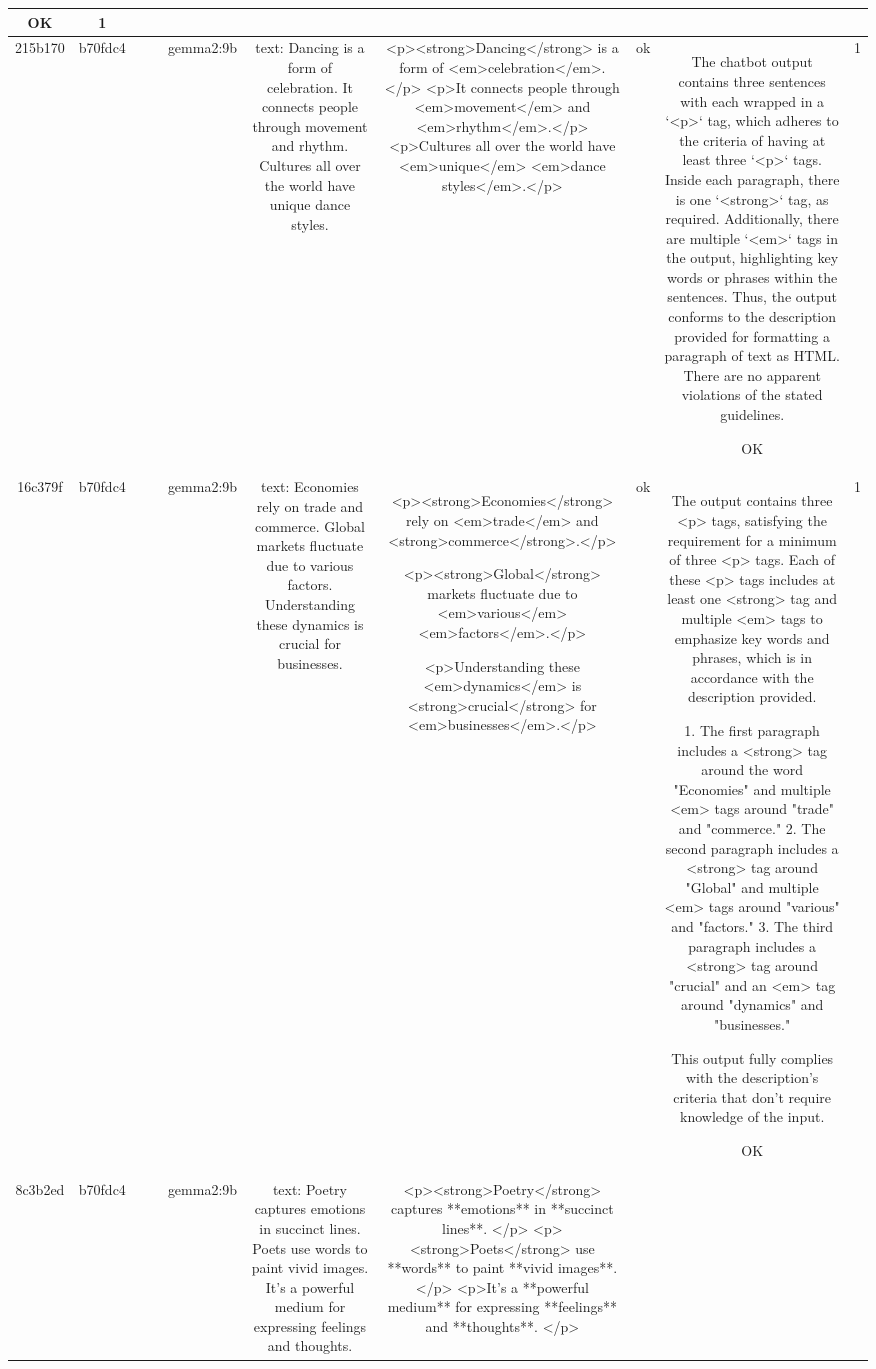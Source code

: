 \begin{table}[h!]
\begin{tabular}{|c|c|c|c|c|c|c|c|c|c|}
OK & 1\\
\hline
215b170 & b70fdc4 &  &  & gemma2:9b & text: Dancing is a form of celebration. It connects people through movement and rhythm. Cultures all over the world have unique dance styles. & <p><strong>Dancing</strong> is a form of <em>celebration</em>.</p>   
<p>It connects people through <em>movement</em> and <em>rhythm</em>.</p>   
<p>Cultures all over the world have <em>unique</em> <em>dance styles</em>.</p>  
 & ok & The chatbot output contains three sentences with each wrapped in a `<p>` tag, which adheres to the criteria of having at least three `<p>` tags. Inside each paragraph, there is one `<strong>` tag, as required. Additionally, there are multiple `<em>` tags in the output, highlighting key words or phrases within the sentences. Thus, the output conforms to the description provided for formatting a paragraph of text as HTML. There are no apparent violations of the stated guidelines.

OK & 1\\
\hline
16c379f & b70fdc4 &  &  & gemma2:9b & text: Economies rely on trade and commerce. Global markets fluctuate due to various factors. Understanding these dynamics is crucial for businesses. & <p><strong>Economies</strong> rely on <em>trade</em> and <strong>commerce</strong>.</p>

<p><strong>Global</strong> markets fluctuate due to <em>various</em> <em>factors</em>.</p>

<p>Understanding these <em>dynamics</em> is <strong>crucial</strong> for <em>businesses</em>.</p>   
 & ok & The output contains three <p> tags, satisfying the requirement for a minimum of three <p> tags. Each of these <p> tags includes at least one <strong> tag and multiple <em> tags to emphasize key words and phrases, which is in accordance with the description provided. 

1. The first paragraph includes a <strong> tag around the word "Economies" and multiple <em> tags around "trade" and "commerce."
2. The second paragraph includes a <strong> tag around "Global" and multiple <em> tags around "various" and "factors."
3. The third paragraph includes a <strong> tag around "crucial" and an <em> tag around "dynamics" and "businesses."

This output fully complies with the description's criteria that don't require knowledge of the input.

OK & 1\\
\hline
8c3b2ed & b70fdc4 &  &  & gemma2:9b & text: Poetry captures emotions in succinct lines. Poets use words to paint vivid images. It's a powerful medium for expressing feelings and thoughts. & <p><strong>Poetry</strong> captures **emotions** in **succinct lines**. </p>
<p><strong>Poets</strong> use **words** to paint **vivid images**. </p>
<p>It's a **powerful medium** for expressing **feelings** and **thoughts**. </p>  



\end{tabular}
\end{table}
